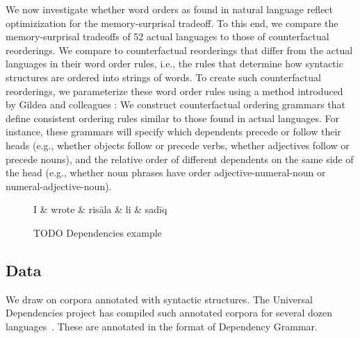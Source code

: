

We now investigate whether word orders as found in natural language reflect optimizization for the memory-surprisal tradeoff.
To this end, we compare the memory-surprisal tradeoffs of 52 actual languages to those of counterfactual reorderings.
We compare to counterfactual reorderings that differ from the actual languages in their word order rules, i.e., the rules that determine how syntactic structures are ordered into strings of words.
To create such counterfactual reorderings, we parameterize these word order rules using a method introduced by Gildea and colleagues \citep{gildea-optimizing-2007, gildea-grammars-2010, gildea-human-2015}:
We construct counterfactual ordering grammars that define consistent ordering rules similar to those found in actual languages.
For instance, these grammars will specify which dependents precede or follow their heads (e.g., whether objects follow or precede verbs, whether adjectives follow or precede nouns), and the relative order of different dependents on the same side of the head (e.g., whether noun phrases have order adjective-numeral-noun or numeral-adjective-noun).

\begin{figure}
\centering
\begin{dependency}[theme = simple]
   \begin{deptext}[column sep=1em]
	   I \&	   wrote \& risāla \& li \& sadīq  \\
   \end{deptext}
\end{dependency}
	\caption{TODO Dependencies example}\label{fig:dependency}
\end{figure}


\subsection{Data}
We draw on corpora annotated with syntactic structures.
The Universal Dependencies project has compiled such annotated corpora for several dozen languages~\citep{nivre-universal-2017}.
These are annotated in the format of Dependency Grammar.

